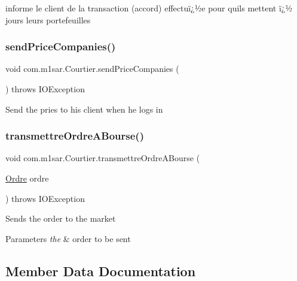 informe le client de la transaction (accord) effectuï¿½e pour qu\textquotesingle{}ils mettent ï¿½ jours leurs portefeuilles \mbox{\label{classcom_1_1m1sar_1_1_courtier_a309ef9b76b3504683d0bf2cf8d634094}} 
\subsubsection{\texorpdfstring{send\+Price\+Companies()}{sendPriceCompanies()}}
{\footnotesize\ttfamily void com.\+m1sar.\+Courtier.\+send\+Price\+Companies (\begin{DoxyParamCaption}{ }\end{DoxyParamCaption}) throws I\+O\+Exception}

Send the pries to his client when he logs in \mbox{\label{classcom_1_1m1sar_1_1_courtier_a54879f046ad25b89a1aed6f573fa1bf2}} 
\subsubsection{\texorpdfstring{transmettre\+Ordre\+A\+Bourse()}{transmettreOrdreABourse()}}
{\footnotesize\ttfamily void com.\+m1sar.\+Courtier.\+transmettre\+Ordre\+A\+Bourse (\begin{DoxyParamCaption}\item[{\hyperlink{classcom_1_1m1sar_1_1_ordre}{Ordre}}]{ordre }\end{DoxyParamCaption}) throws I\+O\+Exception}

Sends the order to the market 
\begin{DoxyParams}{Parameters}
{\em the} & order to be sent \\
\hline
\end{DoxyParams}


\subsection{Member Data Documentation}
\mbox{\label{classcom_1_1m1sar_1_1_courtier_ad00c315730363c06b266dec9f9cb8343}} 

